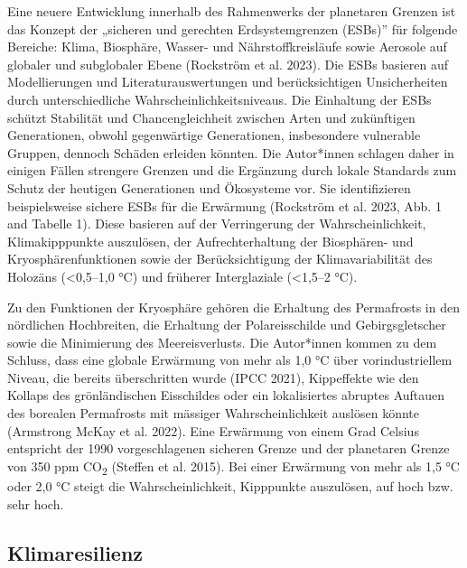 \documentclass[
  nswissgerman,
  a4paper,
  DIV=11,
  numbers=noendperiod,
  oneside,
  openany]{scrreprt}
\begin{document}
Eine neuere Entwicklung innerhalb des Rahmenwerks der planetaren Grenzen
ist das Konzept der „sicheren und gerechten Erdsystemgrenzen (ESBs)''
für folgende Bereiche: Klima, Biosphäre, Wasser- und Nährstoffkreisläufe
sowie Aerosole auf globaler und subglobaler Ebene (Rockström et al.
2023). Die ESBs basieren auf Modellierungen und Literaturauswertungen
und berücksichtigen Unsicherheiten durch unterschiedliche
Wahrscheinlichkeitsniveaus. Die Einhaltung der ESBs schützt Stabilität
und Chancengleichheit zwischen Arten und zukünftigen Generationen,
obwohl gegenwärtige Generationen, insbesondere vulnerable Gruppen,
dennoch Schäden erleiden könnten. Die Autor*innen schlagen daher in
einigen Fällen strengere Grenzen und die Ergänzung durch lokale
Standards zum Schutz der heutigen Generationen und Ökosysteme vor. Sie
identifizieren beispielsweise sichere ESBs für die Erwärmung (Rockström
et al. 2023, Abb. 1 and Tabelle 1). Diese basieren auf der Verringerung
der Wahrscheinlichkeit, Klimakipppunkte auszulösen, der
Aufrechterhaltung der Biosphären- und Kryosphärenfunktionen sowie der
Berücksichtigung der Klimavariabilität des Holozäns (\textless0,5--1,0
°C) und früherer Interglaziale (\textless1,5--2 °C).

Zu den Funktionen der Kryosphäre gehören die Erhaltung des Permafrosts
in den nördlichen Hochbreiten, die Erhaltung der Polareis\-schilde und
Gebirgsgletscher sowie die Minimierung des Meereisverlusts. Die
Autor*innen kommen zu dem Schluss, dass eine globale Erwärmung von mehr
als 1,0 °C über vorindustriellem Niveau, die bereits überschritten wurde
(IPCC 2021), Kippeffekte wie den Kollaps des grönländischen Eisschildes
oder ein lokalisiertes abruptes Auftauen des borealen Permafrosts mit
mässiger Wahrscheinlichkeit auslösen könnte (Armstrong McKay et al.
2022). Eine Erwärmung von einem Grad Celsius entspricht der 1990
vorgeschlagenen sicheren Grenze und der planetaren Grenze von 350 ppm
CO\textsubscript{2} ({Steffen et al.} 2015). Bei einer Erwärmung von
mehr als 1,5 °C oder 2,0 °C steigt die Wahrscheinlichkeit, Kipppunkte
auszulösen, auf hoch bzw. sehr hoch.

\subsection{Klimaresilienz}\label{klimaresilienz}
\end{document}
